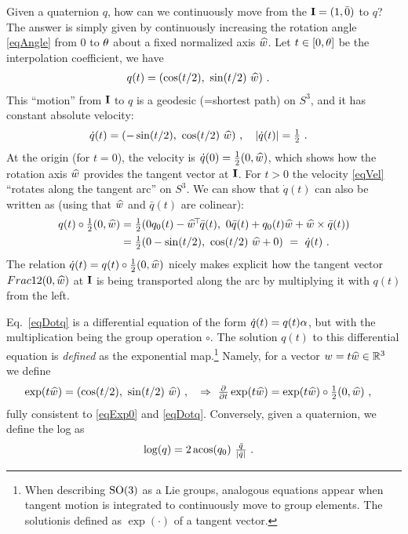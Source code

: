 Given a quaternion $q$, how can we continuously move from the ${\rm\bf I}=(1,\bar
0)$ to $q$? The answer is simply given by continuously increasing the
rotation angle \eqref{eqAngle} from $0$ to $\theta$ about a fixed normalized axis $\widehat w$. Let $t\in[0,\theta]$ be the interpolation coefficient, we have
\begin{align}
q(t)
&= (\cos(t/2),~ \sin(t/2)~ \widehat w) ~. \label{eqExp0}
\end{align}
This ``motion'' from ${\rm\bf I}$ to $q$ is a geodesic (=shortest path) on
$S^3$, and it has constant absolute velocity:
\begin{align}\label{eqVel}
\dot q(t)
&= (-\sin(t/2),~ \cos(t/2)~ \widehat w)~,\quad
|\dot q(t)| = \textstyle\frac12 ~.
\end{align}
At the origin (for $t=0$), the velocity is
$\dot q(0) = \textstyle\frac12 (0, \widehat w)$, which shows
 how the rotation axis $\widehat w$ provides the tangent vector at
${\rm\bf I}$. For $t>0$ the velocity \eqref{eqVel}
``rotates along the tangent arc'' on $S^3$. We can show that $\dot q(t)$
can also be written as (using that $\widehat w$ and $\bar q(t)$ are colinear):
\begin{align}
q(t) \circ \textstyle\frac12 (0, \widehat w)
&= \textstyle\frac12 (0 q_0(t) - \widehat w^{\!\top\!} \bar q(t),~ 0 \bar q(t) + q_0(t) \widehat w + \widehat w \times \bar q(t)) \\
&= \textstyle\frac12 (0 - \sin(t/2),~ \cos(t/2)~ \widehat w + 0) ~=~ \dot q(t) ~.  \label{eqDotq}
\end{align}
The relation $\dot q(t) = q(t) \circ \textstyle\frac12 (0, \widehat w)$ nicely makes explicit how the tangent vector $Frac12 (0, \widehat w)$ at ${\rm\bf I}$ is being transported along the arc by multiplying it with $q(t)$ from the left.

Eq.~\eqref{eqDotq} is a differential equation of the form $\dot q(t)
= q(t) \alpha$, but with the multiplication being the group operation $\circ$. The solution
$q(t)$ to this differential equation is \emph{defined} as the exponential map.\footnote{When describing $\text{SO}(3)$ as a Lie groups,
analogous equations appear when tangent motion is integrated to
continuously move to group elements. The solutionis defined as
$\exp(\cdot)$ of a tangent vector.} Namely, for a vector $w=t\widehat w \in
{\mathbb{R}}^3$ we define
\begin{align}
\exp(t \widehat w)
&= (\cos(t/2),~ \sin(t/2)~ \widehat w) ~,\quad
\Rightarrow~ \textstyle\frac{\partial}{\partial t} \exp(t \widehat w)
 = \exp(t \widehat w) \circ \textstyle\frac12 (0, \widehat w) ~,
\end{align}
fully consistent to \eqref{eqExp0} and \eqref{eqDotq}. Conversely, given a quaternion, we define the log as
\begin{align}
\log(q)
&= 2 \operatorname{acos}(q_0)~ \textstyle\frac{\bar q}{|\bar q|} ~.
\end{align}

